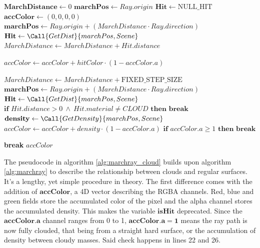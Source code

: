 \begin{algorithm}[H]
\caption{MarchRay}
\label{alg:marchray_cloud}
\begin{algorithmic}[1]
    \State $\mathbf{MarchDistance} \gets 0$
    \State $\mathbf{marchPos} \gets Ray.origin$
    \State $\mathbf{Hit} \gets \text{NULL\_HIT}$
    \State $\mathbf{accColor} \gets (0,0,0,0)$
        \State $\mathbf{marchPos} \gets Ray.origin + (MarchDistance \cdot Ray.direction)$
        \State $\mathbf{Hit} \gets \Call{GetDist}{marchPos, Scene}$
        \State $MarchDistance \gets MarchDistance + Hit.distance$
        
            \State $accColor \gets accColor + hitColor \cdot (1 - accColor.a)$
        \EndIf

                \State $MarchDistance \gets MarchDistance + \text{FIXED\_STEP\_SIZE}$
                \State $\mathbf{marchPos} \gets Ray.origin + (MarchDistance \cdot Ray.direction)$
                \State $\mathbf{Hit} \gets \Call{GetDist}{marchPos, Scene}$
                \State $\textbf{if } Hit.distance > 0 \ \land \ Hit.material \neq CLOUD \textbf{ then } \textbf{break}$
                \State $\mathbf{density} \gets \Call{GetDensity}{marchPos, Scene}$
                    \State $accColor \gets accColor + density \cdot (1 - accColor.a)$
                    \State $\textbf{if } accColor.a \geq 1 \textbf{ then } \textbf{break}$
                \EndIf
            \EndFor
        \EndIf

            \State \textbf{break}
        \EndIf
    \EndFor
    \State \Return $accColor$
\EndProcedure
\end{algorithmic}
\end{algorithm}

The pseudocode in algorithm \ref{alg:marchray_cloud} builds upon algorithm \ref{alg:marchray} to describe the relationship between clouds and regular surfaces. It's a lengthy, yet simple procedure in theory. The first difference comes with the addition of $\mathbf{accColor}$, a 4D vector describing the RGBA channels. Red, blue and green fields store the accumulated color of the pixel and the alpha channel stores the accumulated density. This makes the variable $\mathbf{isHit}$ deprecated. Since the $\mathbf{accColor.a}$ channel ranges from 0 to 1, $\mathbf{accColor.a = 1}$ means the ray path is now fully clouded, that being from a straight hard surface, or the accumulation of density between cloudy masses. Said check happens in lines 22 and 26.

